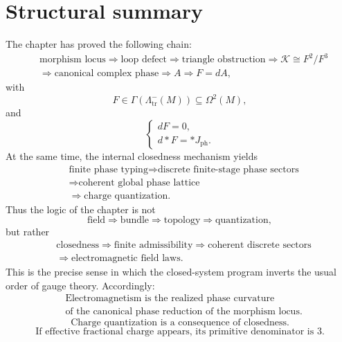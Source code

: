 \section{Structural summary}
\label{sec:em-summary}
The chapter has proved the following chain:
\[
	\begin{aligned}
		 & \text{morphism locus}
		\Longrightarrow
		\text{loop defect}
		\Longrightarrow
		\text{triangle obstruction}
		\Longrightarrow
		\mathcal K\cong F^2/F^3
		\\
		 & \Longrightarrow
		\text{canonical complex phase}
		\Longrightarrow
		A
		\Longrightarrow
		F=dA,
	\end{aligned}
\]
with
\[
	F\in \Gamma(\Lambda^-_{\mathrm{tr}}(M))\subseteq \Omega^2(M),
\]
and
\[
	\begin{cases}
		dF=0, \\[4pt]
		d{*}F={*}J_{\mathrm{ph}}.
	\end{cases}
\]
At the same time, the internal closedness mechanism yields
\[
	\begin{aligned}
		 & \text{finite phase typing}
		\Longrightarrow
		\text{discrete finite-stage phase sectors}
		\\
		 & \Longrightarrow
		\text{coherent global phase lattice}
		\\
		 & \Longrightarrow
		\text{charge quantization}.
	\end{aligned}
\]
Thus the logic of the chapter is not
\[
	\text{field}
	\Longrightarrow
	\text{bundle}
	\Longrightarrow
	\text{topology}
	\Longrightarrow
	\text{quantization},
\]
but rather
\[
	\begin{aligned}
		 & \text{closedness}
		\Longrightarrow
		\text{finite admissibility}
		\Longrightarrow
		\text{coherent discrete sectors}
		\\
		 & \Longrightarrow
		\text{electromagnetic field laws}.
	\end{aligned}
\]
This is the precise sense in which the closed-system program inverts the
usual order of gauge theory.
\medskip
Accordingly:
\[
	\boxed{
		\begin{aligned}
			&\text{Electromagnetism is the realized phase curvature}\\
			&\text{of the canonical phase reduction of the morphism locus.}
		\end{aligned}
	}
\]
\[
	\boxed{
		\text{Charge quantization is a consequence of closedness.}
	}
\]
\[
	\boxed{
		\text{If effective fractional charge appears, its primitive denominator is }3.
	}
\]
